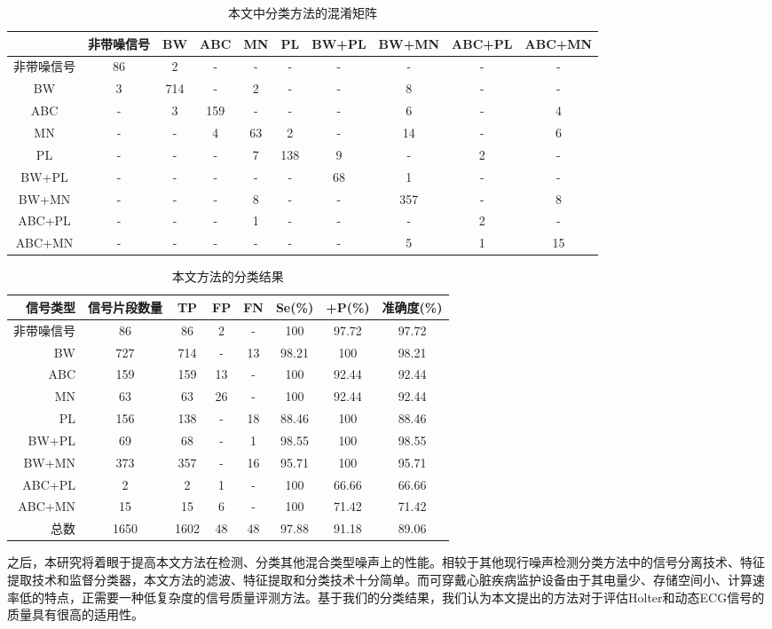 \begin{table}[htp]
\scriptsize
\centering
\caption{本文中分类方法的混淆矩阵 %
\label{tab4}}
\begin{tabular}{|c|c|c|c|c|c|c|c|c|c|}
\hline 
~~ & 非带噪信号 & BW & ABC & MN & PL & BW+PL & BW+MN & ABC+PL & ABC+MN \\ 
\hline 
非带噪信号 & 86 & 2 & - & - & - & - & - & - & - \\ 
\hline 
BW & 3 & 714 & - & 2 & - & - & 8 & - & - \\ 
\hline 
ABC & - & 3 & 159 & - & - & - & 6 & - & 4 \\ 
\hline 
MN & - & - & 4 & 63 & 2 & - & 14 & - & 6 \\ 
\hline 
PL & - & - & - & 7 & 138 & 9 & - & 2 & - \\ 
\hline 
BW+PL & - & - & - & - & - & 68 & 1 & - & - \\ 
\hline 
BW+MN & - & - & - & 8 & - & - & 357 & - & 8 \\ 
\hline 
ABC+PL & - & - & - & 1 & - & - & - & 2 & - \\ 
\hline 
ABC+MN & - & - & - & - & - & - & 5 & 1 & 15 \\ 
\hline 
\end{tabular} 
\end{table}
\begin{table}[htp]
\small
\centering
\caption{本文方法的分类结果 %
\label{tab3}}
\begin{tabular}{|r|c|c|c|c|c|c|c|}
\hline 
信号类型 & 信号片段数量 & TP & FP & FN & Se(\%) & +P(\%) & 准确度(\%) \\ 
\hline 
非带噪信号 & 86 & 86 & 2 & - & 100 & 97.72 & 97.72 \\ 
\hline 
BW & 727 & 714 & - & 13 & 98.21 & 100 & 98.21 \\ 
\hline 
ABC & 159 & 159 & 13 & - & 100 & 92.44 & 92.44 \\ 
\hline 
MN & 63 & 63 & 26 & - & 100 & 92.44 & 92.44 \\ 
\hline 
PL & 156 & 138 & - & 18 & 88.46 & 100 & 88.46 \\ 
\hline 
BW+PL & 69 & 68 & - & 1 & 98.55 & 100 & 98.55 \\ 
\hline 
BW+MN & 373 & 357 & - & 16 & 95.71 & 100 & 95.71 \\ 
\hline 
ABC+PL & 2 & 2 & 1 & - & 100 & 66.66 & 66.66 \\ 
\hline 
ABC+MN & 15 & 15 & 6 & - & 100 & 71.42 & 71.42 \\ 
\hline 
总数 & 1650 & 1602 & 48 & 48 & 97.88 & 91.18 & 89.06 \\ 
\hline 
\end{tabular}   
\end{table}

之后，本研究将着眼于提高本文方法在检测、分类其他混合类型噪声上的性能。相较于其他现行噪声检测分类方法中的信号分离技术、特征提取技术和监督分类器，本文方法的滤波、特征提取和分类技术十分简单。而可穿戴心脏疾病监护设备由于其电量少、存储空间小、计算速率低的特点，正需要一种低复杂度的信号质量评测方法。基于我们的分类结果，我们认为本文提出的方法对于评估Holter和动态ECG信号的质量具有很高的适用性。
